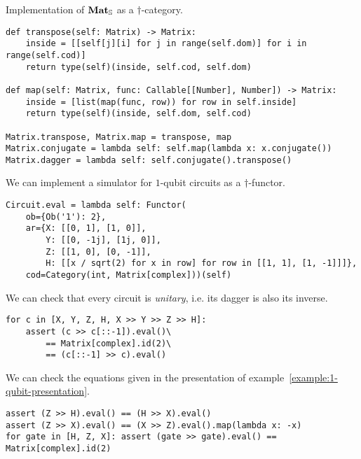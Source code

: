 \begin{python}
{\normalfont Implementation of $\mathbf{Mat}_\S$ as a $\dagger$-category.}

\begin{verbatim}
def transpose(self: Matrix) -> Matrix:
    inside = [[self[j][i] for j in range(self.dom)] for i in range(self.cod)]
    return type(self)(inside, self.cod, self.dom)

def map(self: Matrix, func: Callable[[Number], Number]) -> Matrix:
    inside = [list(map(func, row)) for row in self.inside]
    return type(self)(inside, self.dom, self.cod)

Matrix.transpose, Matrix.map = transpose, map
Matrix.conjugate = lambda self: self.map(lambda x: x.conjugate())
Matrix.dagger = lambda self: self.conjugate().transpose()
\end{verbatim}
\end{python}

\begin{example}
We can implement a simulator for $1$-qubit circuits as a $\dagger$-functor.

\begin{verbatim}
Circuit.eval = lambda self: Functor(
    ob={Ob('1'): 2},
    ar={X: [[0, 1], [1, 0]],
        Y: [[0, -1j], [1j, 0]],
        Z: [[1, 0], [0, -1]],
        H: [[x / sqrt(2) for x in row] for row in [[1, 1], [1, -1]]]},
    cod=Category(int, Matrix[complex]))(self)
\end{verbatim}

We can check that every circuit is \emph{unitary}, i.e. its dagger is also its inverse.

\begin{verbatim}
for c in [X, Y, Z, H, X >> Y >> Z >> H]:
    assert (c >> c[::-1]).eval()\
        == Matrix[complex].id(2)\
        == (c[::-1] >> c).eval()
\end{verbatim}

We can check the equations given in the presentation of example~\ref{example:1-qubit-presentation}.

\begin{verbatim}
assert (Z >> H).eval() == (H >> X).eval()
assert (Z >> X).eval() == (X >> Z).eval().map(lambda x: -x)
for gate in [H, Z, X]: assert (gate >> gate).eval() == Matrix[complex].id(2)
\end{verbatim}
\end{example}

